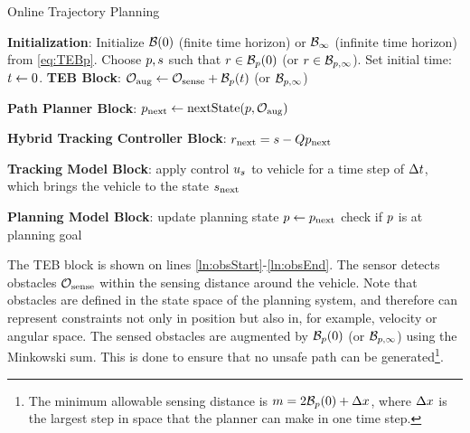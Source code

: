 \begin{algorithm}	
	\caption{Online Trajectory Planning}
	\label{alg:algOnline}
	\begin{algorithmic}[1]
		\STATE \textbf{Initialization}: \label{ln:Istart}
 		\STATE Initialize $\mathcal B(0)$ (finite time horizon) or $\mathcal B_\infty$ (infinite time horizon) from \eqref{eq:TEBp}. 
		\STATE Choose $p, s$ such that $r \in  \mathcal B_p(0)$ (or $r\in\mathcal B_{p,\infty}$).
    \STATE Set initial time: $t \leftarrow 0$. \label{ln:Iend}
		\STATE \textbf{TEB Block}: \label{ln:obsStart}
		\STATE $\mathcal{O}_\text{aug} \leftarrow \mathcal{O}_\text{sense} + \mathcal B_p(t)$ (or $\mathcal B_{p, \infty}$)\label{ln:obsEnd}
		
		\STATE \textbf{Path Planner Block}:\label{ln:plannerStart}
		\STATE $p_\text{next} \leftarrow \text{nextState}(p, \mathcal{O}_\text{aug})$\label{ln:plannerEnd}
		
		\STATE \textbf{Hybrid Tracking Controller Block}:\label{ln:controllerStart}
		\STATE $r_\text{next} = s - Qp_\text{next}$
		
		\ELSE {} 
           \ENDIF \label{ln:controllerEnd}
		
		\STATE \textbf{Tracking Model Block}: \label{ln:trackingStart}
		\STATE apply control $u_s$ to vehicle for a time step of $\Delta t$, which brings the vehicle to the state $s_\text{next}$ \label{ln:trackingEnd}
		
		\STATE \textbf{Planning Model Block}:\label{ln:planningStart}
		\STATE update planning state $p \leftarrow p_\text{next}$
		\STATE check if $p$ is at planning goal \label{ln:planningEnd}
		\ENDWHILE
	\end{algorithmic}
\end{algorithm}
The TEB block is shown on lines \ref{ln:obsStart}-\ref{ln:obsEnd}. 
The sensor detects obstacles $\mathcal{O}_\text{sense}$ within the sensing distance around the vehicle.
Note that obstacles are defined in the state space of the planning system, and therefore can represent constraints not only in position but also in, for example, velocity or angular space.
The sensed obstacles are augmented by $\mathcal B_p(0)$ (or $\mathcal B_{p, \infty}$) using the Minkowski sum. 
This is done to ensure that no unsafe path can be generated\footnote{The minimum allowable sensing distance is $m = 2\mathcal B_p(0) + \Delta x$, where $\Delta x$ is the largest step in space that the planner can make in one time step.}.

